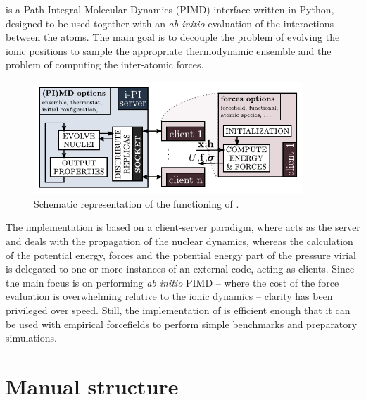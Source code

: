 \documentclass[11pt,english,fleqn]{report}
\begin{document}
\label{intro}

\ipi is a Path Integral Molecular Dynamics (PIMD) interface written
in Python, designed to be used together with an \emph{ab initio} evaluation
of the interactions between the atoms. The main goal is to decouple
the problem of evolving the ionic positions to sample the appropriate
thermodynamic ensemble and the problem of computing the inter-atomic
forces. 

\begin{figure}[hb]
\centering\includegraphics[width=0.9\textwidth]{figures/ipi-scheme.pdf}
\caption{\label{fig:scheme} Schematic representation of the functioning of \ipi{}.} 
\end{figure}

The implementation is based on a client-server paradigm, where \ipi
acts as the server and deals with the propagation of the nuclear dynamics,
whereas the calculation of the potential energy, forces and the potential
energy part of the pressure virial is delegated to one or more instances
of an external code, acting as clients. Since the main focus is on
performing \emph{ab initio} PIMD -- where the cost of the force evaluation
is overwhelming relative to the ionic dynamics -- clarity has been
privileged over speed. Still, the implementation of \ipi is efficient
enough that it can be used with empirical forcefields to perform simple
benchmarks and preparatory simulations. 


\section{Manual structure}
\end{document}
